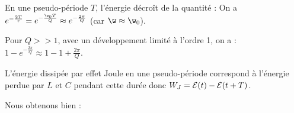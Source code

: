 \documentclass[a4paper, 10pt, garamond]{book}
\begin{document}
\begin{blocQR}
{	En une pseudo-période $T$, l'énergie décroît de la quantité :
	On a $ e^{ -\frac{2T}{\tau} } = e^{ -\frac{\w_0 T}{Q} } \approx e^{ -\frac{2 \pi}{Q} } $ (car $\w \approx \w_0$).

	Pour $Q >> 1$, avec un développement limité à l'ordre 1, on a : $ 1 - e^{ -\frac{2 \pi}{Q} } \approx 1 - 1 + \frac{2 \pi}{Q}$.

	L'énergie dissipée par effet Joule en une pseudo-période correspond à l'énergie perdue par $L$ et $C$ pendant cette durée donc $W_J = {\cal E}(t) - {\cal E}(t+T) $.

	Nous obtenons bien :

	}
\end{blocQR}
\end{document}
